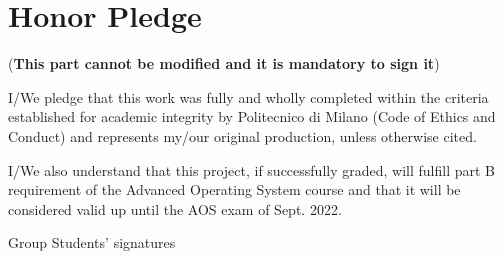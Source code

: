 \documentclass[10pt,a4]{article}
\begin{document}

\section{Honor Pledge}
(\textbf{This part cannot be modified and it is mandatory to sign it})

I/We pledge that this work was fully and wholly completed within the criteria
established for academic integrity by Politecnico di Milano (Code of Ethics and
Conduct) and represents my/our original production, unless otherwise cited.

I/We also understand that this project, if successfully graded,  will fulfill part B requirement of the
Advanced Operating System course and that it will be considered valid up until
the AOS exam of Sept. 2022.

\begin{flushright}
Group Students' signatures
\end{flushright}
\end{document}
